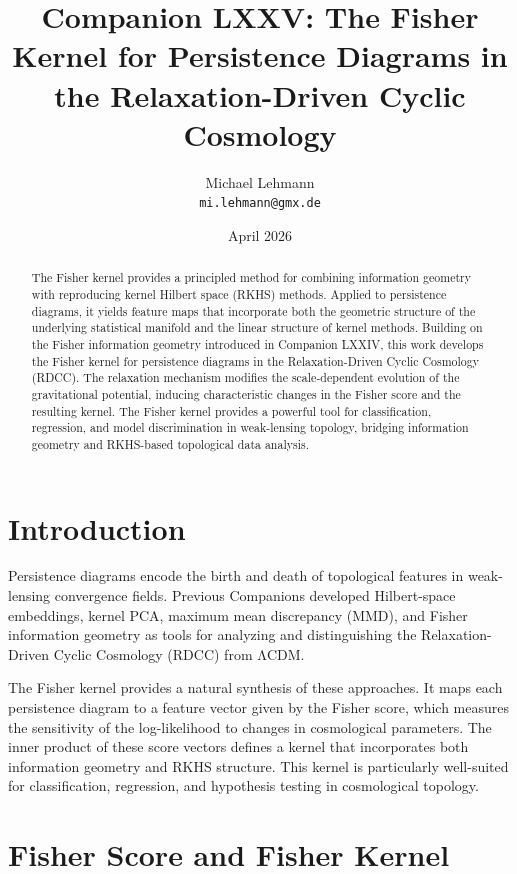 \documentclass[11pt,a4paper]{article}
\title{\textbf{Companion LXXV: The Fisher Kernel for Persistence Diagrams in the Relaxation-Driven Cyclic Cosmology}}
\author{Michael Lehmann \\ \texttt{mi.lehmann@gmx.de}}
\date{April 2026}
\begin{document}
\maketitle

\begin{abstract}
The Fisher kernel provides a principled method for combining information geometry 
with reproducing kernel Hilbert space (RKHS) methods. Applied to persistence 
diagrams, it yields feature maps that incorporate both the geometric structure of 
the underlying statistical manifold and the linear structure of kernel methods. 
Building on the Fisher information geometry introduced in Companion LXXIV, this 
work develops the Fisher kernel for persistence diagrams in the Relaxation-Driven 
Cyclic Cosmology (RDCC). The relaxation mechanism modifies the scale-dependent 
evolution of the gravitational potential, inducing characteristic changes in the 
Fisher score and the resulting kernel. The Fisher kernel provides a powerful tool 
for classification, regression, and model discrimination in weak-lensing topology, 
bridging information geometry and RKHS-based topological data analysis.
\end{abstract}
\section{Introduction}

Persistence diagrams encode the birth and death of topological features in weak-
lensing convergence fields. Previous Companions developed Hilbert-space embeddings, 
kernel PCA, maximum mean discrepancy (MMD), and Fisher information geometry as 
tools for analyzing and distinguishing the Relaxation-Driven Cyclic Cosmology 
(RDCC) from ΛCDM.

The Fisher kernel provides a natural synthesis of these approaches. It maps each 
persistence diagram to a feature vector given by the Fisher score, which measures 
the sensitivity of the log-likelihood to changes in cosmological parameters. The 
inner product of these score vectors defines a kernel that incorporates both 
information geometry and RKHS structure. This kernel is particularly well-suited 
for classification, regression, and hypothesis testing in cosmological topology.
\section{Fisher Score and Fisher Kernel}
\end{document}

